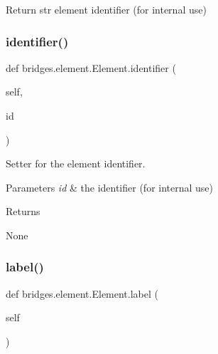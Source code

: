 \begin{DoxyParagraph}{Return}
str element identifier (for internal use) 
\end{DoxyParagraph}
\mbox{\label{classbridges_1_1element_1_1_element_a70ac403466ed78146974a22cebfa0c19}} 
\subsubsection{\texorpdfstring{identifier()}{identifier()}\hspace{0.1cm}{\footnotesize\ttfamily [2/2]}}
{\footnotesize\ttfamily def bridges.\+element.\+Element.\+identifier (\begin{DoxyParamCaption}\item[{}]{self,  }\item[{}]{id }\end{DoxyParamCaption})}



Setter for the element identifier. 


\begin{DoxyParams}{Parameters}
{\em id} & the identifier (for internal use) \\
\hline
\end{DoxyParams}
\begin{DoxyReturn}{Returns}


None 
\end{DoxyReturn}
\mbox{\label{classbridges_1_1element_1_1_element_a3cd2f535bb7993254b8d255cb0166062}} 
\subsubsection{\texorpdfstring{label()}{label()}\hspace{0.1cm}{\footnotesize\ttfamily [1/2]}}
{\footnotesize\ttfamily def bridges.\+element.\+Element.\+label (\begin{DoxyParamCaption}\item[{}]{self }\end{DoxyParamCaption})}



